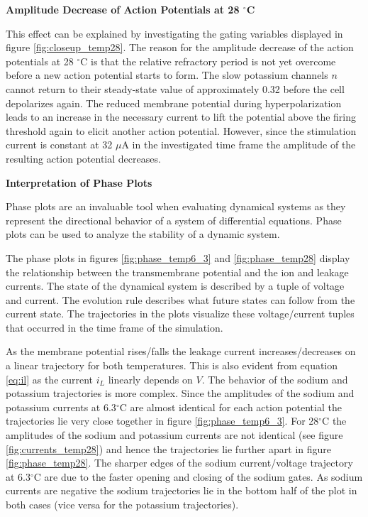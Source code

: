 \documentclass{scrartcl}
\begin{document}
\textbf{Amplitude Decrease of Action Potentials at 28 $^{\circ}$C}

This effect can be explained by investigating the gating variables displayed in figure \ref{fig:closeup_temp28}. The reason for the amplitude decrease of the action potentials at 28 $^{\circ}$C is that the relative refractory period is not yet overcome before a new action potential starts to form. The slow potassium channels $n$ cannot return to their steady-state value of approximately 0.32 before the cell depolarizes again. The reduced membrane potential during hyperpolarization leads to an increase in the necessary current to lift the potential above the firing threshold again to elicit another action potential. However, since the stimulation current is constant at 32 $\mu$A in the investigated time frame the amplitude of the resulting action potential decreases.

\textbf{Interpretation of Phase Plots}

Phase plots are an invaluable tool when evaluating dynamical systems as they represent the directional behavior of a system of differential equations. Phase plots can be used to analyze the stability of a dynamic system. 

The phase plots in figures \ref{fig:phase_temp6_3} and \ref{fig:phase_temp28} display the relationship between the transmembrane potential and the ion and leakage currents. The state of the dynamical system is described by a tuple of voltage and current. The evolution rule describes what future states can follow from the current state. The trajectories in the plots visualize these voltage/current tuples that occurred in the time frame of the simulation. 

As the membrane potential rises/falls the leakage current increases/decreases on a linear trajectory for both temperatures. This is also evident from equation \ref{eq:il} as the current $i_L$ linearly depends on $V$. The behavior of the sodium and potassium trajectories is more complex. Since the amplitudes of the sodium and potassium currents at 6.3$^\circ$C are almost identical for each action potential the trajectories lie very close together in figure \ref{fig:phase_temp6_3}. For 28$^\circ$C the amplitudes of the sodium and potassium currents are not identical (see figure \ref{fig:currents_temp28}) and hence the trajectories lie further apart in figure \ref{fig:phase_temp28}. The sharper edges of the sodium current/voltage trajectory at 6.3$^\circ$C are due to the faster opening and closing of the sodium gates. As sodium currents are negative the sodium trajectories lie in the bottom half of the plot in both cases (vice versa for the potassium trajectories).
\end{document}
